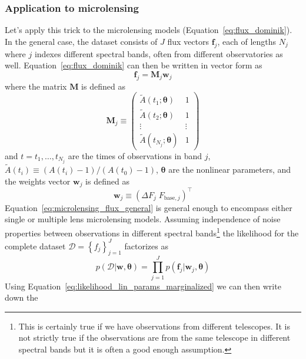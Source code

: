 \documentclass[12pt,dvipsnames]{report}
\renewcommand{\vec}[1]{\boldsymbol{\mathbf{#1}}}
\begin{document}
\subsubsection{Application to microlensing}
Let's apply this trick to the microlensing models
(Equation~\ref{eq:flux_dominik}). In the general case, the dataset consists of
$J$ flux vectors $\vec{f}_j$, each of lengths $N_j$ where $j$ indexes different
spectral bands, often from different observatories as well.
Equation~\ref{eq:flux_dominik} can then be written in vector form as
\begin{equation}
    \vec{f}_j=\vec{M}_j\vec{w}_j
    \label{eq:microlensing_flux_general}
\end{equation}
where the matrix $\vec{M}$ is defined as
\begin{equation}
    \vec{M}_j\equiv \begin{pmatrix}
        \tilde{A}(t_1;\vec{\theta})     & 1      \\
        \tilde{A}(t_2;\vec{\theta})     & 1      \\
        \vdots                          & \vdots \\
        \tilde{A}(t_{N_j};\vec{\theta}) & 1
    \end{pmatrix}
\end{equation}
and $t=t_1,\ldots, t_{N_j}$ are the times of observations in band $j$,
$\tilde{A}(t_i) \equiv (A(t_i)-1) /(A\left(t_{0}\right)-1)$, $\vec{\theta}$ are the
nonlinear parameters, and the weights vector $\vec{w}_j$ is defined as
\begin{equation}
    \vec{w}_j\equiv    \left( \Delta F_j\; F_{\mathrm{base},j}\right)^\intercal
\end{equation}
Equation~\ref{eq:microlensing_flux_general} is general enough to encompass
either single or multiple lens microlensing models. Assuming independence of
noise properties between observations in different spectral bands\footnote{This
    is certainly true if we have observations from different telescopes. It is not
    strictly true if the observations are from the same telescope in different
    spectral bands but it is often a good enough assumption.} the likelihood for
the complete dataset
$\mathcal{D}=\left\{f_{j}\right\}_{j=1}^{J}$ factorizes as
\begin{equation}
    p(\mathcal{D}\lvert \vec{w}, \vec{\theta})=\prod_{j=1}^J p(\vec{f}_j\lvert \vec{w}_j, \vec{\theta})
\end{equation}
Using Equation~\ref{eq:likelihood_lin_params_marginalized} we can then write down the
\end{document}
